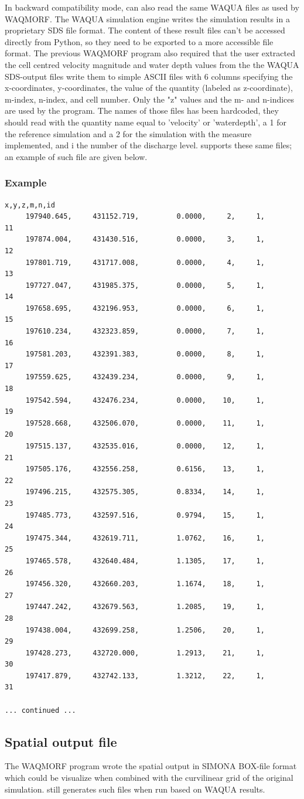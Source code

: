 In backward compatibility mode, \dfmi can also read the same WAQUA files as used by WAQMORF.
The WAQUA simulation engine writes the simulation results in a proprietary SDS file format.
The content of these result files can't be accessed directly from Python, so they need to be exported to a more accessible file format.
The previous WAQMORF program also required that the user extracted the cell centred velocity magnitude and water depth values from the the WAQUA SDS-output files write them to simple ASCII files with 6 columns specifying the x-coordinates, y-coordinates, the value of the quantity (labeled as z-coordinate), m-index, n-index, and cell number.
Only the "z" values and the m- and n-indices are used by the program.
The names of those files has been hardcoded, they should read  with the quantity name equal to 'velocity' or 'waterdepth', a 1 for the reference simulation and a 2 for the simulation with the measure implemented, and i the number of the discharge level.
\dfastmi supports these same files; an example of such file are given below.

\subsubsection*{Example}

\begin{Verbatim}
x,y,z,m,n,id
     197940.645,     431152.719,         0.0000,     2,     1,        11
     197874.004,     431430.516,         0.0000,     3,     1,        12
     197801.719,     431717.008,         0.0000,     4,     1,        13
     197727.047,     431985.375,         0.0000,     5,     1,        14
     197658.695,     432196.953,         0.0000,     6,     1,        15
     197610.234,     432323.859,         0.0000,     7,     1,        16
     197581.203,     432391.383,         0.0000,     8,     1,        17
     197559.625,     432439.234,         0.0000,     9,     1,        18
     197542.594,     432476.234,         0.0000,    10,     1,        19
     197528.668,     432506.070,         0.0000,    11,     1,        20
     197515.137,     432535.016,         0.0000,    12,     1,        21
     197505.176,     432556.258,         0.6156,    13,     1,        22
     197496.215,     432575.305,         0.8334,    14,     1,        23
     197485.773,     432597.516,         0.9794,    15,     1,        24
     197475.344,     432619.711,         1.0762,    16,     1,        25
     197465.578,     432640.484,         1.1305,    17,     1,        26
     197456.320,     432660.203,         1.1674,    18,     1,        27
     197447.242,     432679.563,         1.2085,    19,     1,        28
     197438.004,     432699.258,         1.2506,    20,     1,        29
     197428.273,     432720.000,         1.2913,    21,     1,        30
     197417.879,     432742.133,         1.3212,    22,     1,        31 

... continued ...
\end{Verbatim}


\subsection{Spatial output file}

The WAQMORF program wrote the spatial output in SIMONA BOX-file format which could be visualize when combined with the curvilinear grid of the original simulation.
\dfastmi still generates such files when run based on WAQUA results.
